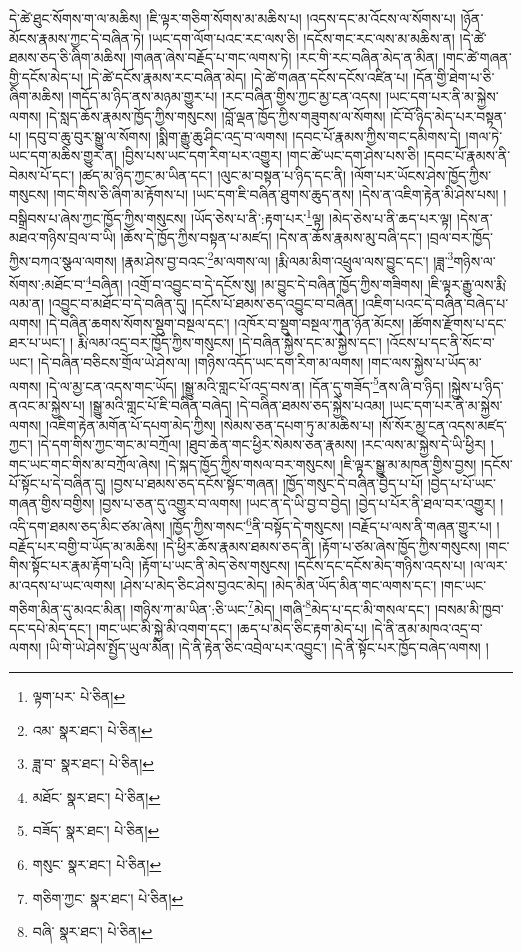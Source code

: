 དེ་ཚེ་ཐུང་སོགས་ག་ལ་མཆིས། །ཇི་ལྟར་གཅིག་སོགས་མ་མཆིས་པ། །འདས་དང་མ་འོངས་ལ་སོགས་པ། །ཉོན་མོངས་རྣམས་ཀྱང་དེ་བཞིན་ཏེ། །ཡང་དག་ལོག་པའང་རང་ལས་ཅི། །དངོས་གང་རང་ལས་མ་མཆིས་ན། །དེ་ཚེ་ཐམས་ཅད་ཅི་ཞིག་མཆིས། །གཞན་ཞེས་བརྗོད་པ་གང་ལགས་ཏེ། །རང་གི་རང་བཞིན་མེད་ན་མིན། །གང་ཚེ་གཞན་གྱི་དངོས་མེད་པ། །དེ་ཚེ་དངོས་རྣམས་རང་བཞིན་མེད། །དེ་ཚེ་གཞན་དངོས་དངོས་འཛིན་པ། །དོན་གྱི་ཐེག་པ་ཅི་ཞིག་མཆིས། །གདོད་མ་ཉིད་ནས་མཉམ་གྱུར་པ། །རང་བཞིན་གྱིས་ཀྱང་མྱ་ངན་འདས། །ཡང་དག་པར་ནི་མ་སྐྱེས་ལགས། །དེ་སླད་ཆོས་རྣམས་ཁྱོད་ཀྱིས་གསུངས། །བློ་ལྡན་ཁྱོད་ཀྱིས་གཟུགས་ལ་སོགས། །ངོ་བོ་ཉིད་མེད་པར་བསྟན་པ། །དབུ་བ་ཆུ་བུར་སྒྱུ་ལ་སོགས། །སྨིག་རྒྱུ་ཆུ་ཤིང་འདྲ་བ་ལགས། །དབང་པོ་རྣམས་ཀྱིས་གང་དམིགས་དེ། །གལ་ཏེ་ཡང་དག་མཆིས་གྱུར་ན། །བྱིས་པས་ཡང་དག་རིག་པར་འགྱུར། །གང་ཚེ་ཡང་དག་ཤེས་པས་ཅི། །དབང་པོ་རྣམས་ནི་བེམས་པོ་དང་། །ཚད་མ་ཉིད་ཀྱང་མ་ཡིན་དང་། །ལུང་མ་བསྟན་པ་ཉིད་དང་ནི། །ལོག་པར་ཡོངས་ཤེས་ཁྱོད་ཀྱིས་གསུངས། །གང་གིས་ཅི་ཞིག་མ་རྟོགས་པ། །ཡང་དག་ཇི་བཞིན་ཐུགས་ཆུད་ནས། །དེས་ན་འཇིག་རྟེན་མི་ཤེས་པས། །བསྒྲིབས་པ་ཞེས་ཀྱང་ཁྱོད་ཀྱིས་གསུངས། །ཡོད་ཅེས་པ་ནི་:རྟག་པར་\footnote{ལྟག་པར་  པེ་ཅིན། }ལྟ། །མེད་ཅེས་པ་ནི་ཆད་པར་ལྟ། །དེས་ན་མཐའ་གཉིས་བྲལ་བ་ཡི། །ཆོས་དེ་ཁྱོད་ཀྱིས་བསྟན་པ་མཛད། །དེས་ན་ཆོས་རྣམས་མུ་བཞི་དང་། །བྲལ་བར་ཁྱོད་ཀྱིས་བཀའ་སྩལ་ལགས། །རྣམ་ཤེས་བྱ་བའང་\footnote{འམ་  སྣར་ཐང་།  པེ་ཅིན། }མ་ལགས་ལ། །རྨི་ལམ་མིག་འཕྲུལ་ལས་བྱུང་དང་། །ཟླ་\footnote{ཟླ་བ་  སྣར་ཐང་།  པེ་ཅིན། }གཉིས་ལ་སོགས་:མཐོང་བ་\footnote{མཐོང་  སྣར་ཐང་།  པེ་ཅིན། }བཞིན། །འགྲོ་བ་འབྱུང་བ་དེ་དངོས་སུ། །མ་བྱུང་དེ་བཞིན་ཁྱོད་ཀྱིས་གཟིགས། །ཇི་ལྟར་རྒྱུ་ལས་རྨི་ལམ་ན། །འབྱུང་བ་མཐོང་བ་དེ་བཞིན་དུ། །དངོས་པོ་ཐམས་ཅད་འབྱུང་བ་བཞིན། །འཇིག་པའང་དེ་བཞིན་བཞེད་པ་ལགས། །དེ་བཞིན་ཆགས་སོགས་སྡུག་བསྔལ་དང་། །འཁོར་བ་སྡུག་བསྔལ་ཀུན་ཉོན་མོངས། །ཚོགས་རྫོགས་པ་དང་ཐར་པ་ཡང་། །
རྨི་ལམ་འདྲ་བར་ཁྱོད་ཀྱིས་གསུངས། །དེ་བཞིན་སྐྱེས་དང་མ་སྐྱེས་དང་། །འོངས་པ་དང་ནི་སོང་བ་ཡང་། །དེ་བཞིན་བཅིངས་གྲོལ་ཡེ་ཤེས་ལ། །གཉིས་འདོད་ཡང་དག་རིག་མ་ལགས། །གང་ལས་སྐྱེས་པ་ཡོད་མ་ལགས། །དེ་ལ་མྱ་ངན་འདས་གང་ཡོད། །སྒྱུ་མའི་གླང་པོ་འདྲ་བས་ན། །དོན་དུ་གཟོད་\footnote{བཟོད་  སྣར་ཐང་།  པེ་ཅིན། }ནས་ཞི་བ་ཉིད། །སྐྱེས་པ་ཉིད་ནའང་མ་སྐྱེས་པ། །སྒྱུ་མའི་གླང་པོ་ཇི་བཞིན་བཞེད། །དེ་བཞིན་ཐམས་ཅད་སྐྱེས་པའམ། །ཡང་དག་པར་ནི་མ་སྐྱེས་ལགས། །འཇིག་རྟེན་མགོན་པོ་དཔག་མེད་ཀྱིས། །སེམས་ཅན་དཔག་ཏུ་མ་མཆིས་པ། །སོ་སོར་མྱ་ངན་འདས་མཛད་ཀྱང་། །དེ་དག་གིས་ཀྱང་གང་མ་བཀྲོལ། །ཐུབ་ཆེན་གང་ཕྱིར་སེམས་ཅན་རྣམས། །རང་ལས་མ་སྐྱེས་དེ་ཡི་ཕྱིར། །གང་ཡང་གང་གིས་མ་བཀྲོལ་ཞེས། །དེ་སྐད་ཁྱོད་ཀྱིས་གསལ་བར་གསུངས། །ཇི་ལྟར་སྒྱུ་མ་མཁན་གྱིས་བྱས། །དངོས་པོ་སྟོང་པ་དེ་བཞིན་དུ། །བྱས་པ་ཐམས་ཅད་དངོས་སྟོང་གཞན། །ཁྱོད་གསུང་དེ་བཞིན་བྱེད་པ་པོ། །བྱེད་པ་པོ་ཡང་གཞན་གྱིས་བགྱིས། །བྱས་པ་ཅན་དུ་འགྱུར་བ་ལགས། །ཡང་ན་དེ་ཡི་བྱ་བ་བྱེད། །བྱེད་པ་པོར་ནི་ཐལ་བར་འགྱུར། །འདི་དག་ཐམས་ཅད་མིང་ཙམ་ཞེས། །ཁྱོད་ཀྱིས་གསང་\footnote{གསུང་  སྣར་ཐང་།  པེ་ཅིན། }ནི་བསྟོད་དེ་གསུངས། །བརྗོད་པ་ལས་ནི་གཞན་གྱུར་པ། །བརྗོད་པར་བགྱི་བ་ཡོད་མ་མཆིས། །དེ་ཕྱིར་ཆོས་རྣམས་ཐམས་ཅད་ནི། །རྟོག་པ་ཙམ་ཞེས་ཁྱོད་ཀྱིས་གསུངས། །གང་གིས་སྟོང་པར་རྣམ་རྟོག་པའི། །རྟོག་པ་ཡང་ནི་མེད་ཅེས་གསུངས། །དངོས་དང་དངོས་མེད་གཉིས་འདས་པ། །ལ་ལར་མ་འདས་པ་ཡང་ལགས། །ཤེས་པ་མེད་ཅིང་ཤེས་བྱའང་མེད། །མེད་མིན་ཡོད་མིན་གང་ལགས་དང་། །གང་ཡང་གཅིག་མིན་དུ་མའང་མིན། །གཉིས་ཀ་མ་ཡིན་:ཅི་ཡང་\footnote{གཅིག་ཀྱང་  སྣར་ཐང་།  པེ་ཅིན། }མེད། །གཞི་\footnote{བཞི་  སྣར་ཐང་།  པེ་ཅིན། }མེད་པ་དང་མི་གསལ་དང་། །བསམ་མི་ཁྱབ་དང་དཔེ་མེད་དང་། །གང་ཡང་མི་སྐྱེ་མི་འགག་དང་། །ཆད་པ་མེད་ཅིང་རྟག་མེད་པ། །དེ་ནི་ནམ་མཁའ་འདྲ་བ་ལགས། །ཡི་གེ་ཡེ་ཤེས་སྤྱོད་ཡུལ་མིན། །དེ་ནི་རྟེན་ཅིང་འབྲེལ་པར་འབྱུང་། །དེ་ནི་སྟོང་པར་ཁྱོད་བཞེད་ལགས། །
